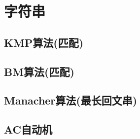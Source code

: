 \section{字符串}
\subsection{KMP算法(匹配)}
\subsection{BM算法(匹配)}
\subsection{Manacher算法(最长回文串)}
\subsection{AC自动机}
%
%
%
%